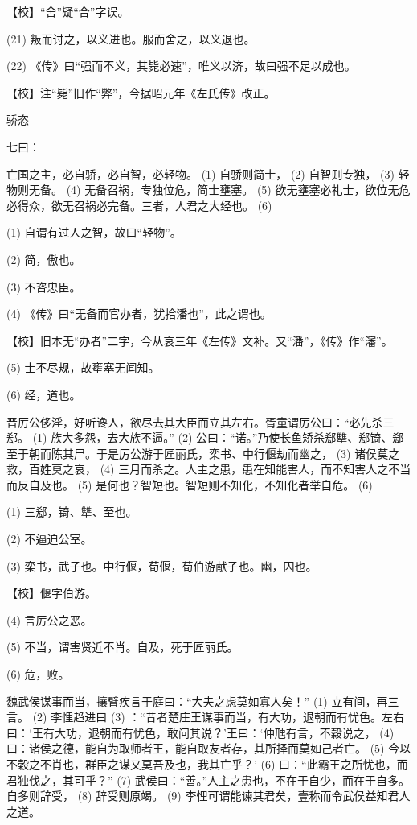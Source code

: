 \documentclass[12pt,UTF8]{ctexbook}
\begin{document}
【校】“舍”疑“合”字误。

(21) 叛而讨之，以义进也。服而舍之，以义退也。

(22) 《传》曰“强而不义，其毙必速”，唯义以济，故曰强不足以成也。

【校】注“毙”旧作“弊”，今据昭元年《左氏传》改正。





骄恣


七曰：

亡国之主，必自骄，必自智，必轻物。 (1) 自骄则简士， (2) 自智则专独， (3) 轻物则无备。 (4) 无备召祸，专独位危，简士壅塞。 (5) 欲无壅塞必礼士，欲位无危必得众，欲无召祸必完备。三者，人君之大经也。 (6)

(1) 自谓有过人之智，故曰“轻物”。

(2) 简，傲也。

(3) 不咨忠臣。

(4) 《传》曰“无备而官办者，犹拾潘也”，此之谓也。

【校】旧本无“办者”二字，今从哀三年《左传》文补。又“潘”，《传》作“瀋”。

(5) 士不尽规，故壅塞无闻知。

(6) 经，道也。

晋厉公侈淫，好听谗人，欲尽去其大臣而立其左右。胥童谓厉公曰：“必先杀三郄。 (1) 族大多怨，去大族不逼。” (2) 公曰：“诺。”乃使长鱼矫杀郄犨、郄锜、郄至于朝而陈其尸。于是厉公游于匠丽氏，栾书、中行偃劫而幽之， (3) 诸侯莫之救，百姓莫之哀， (4) 三月而杀之。人主之患，患在知能害人，而不知害人之不当而反自及也。 (5) 是何也？智短也。智短则不知化，不知化者举自危。 (6)

(1) 三郄，锜、犨、至也。

(2) 不逼迫公室。

(3) 栾书，武子也。中行偃，荀偃，荀伯游献子也。幽，囚也。

【校】偃字伯游。

(4) 言厉公之恶。

(5) 不当，谓害贤近不肖。自及，死于匠丽氏。

(6) 危，败。

魏武侯谋事而当，攘臂疾言于庭曰：“大夫之虑莫如寡人矣！” (1) 立有间，再三言。 (2) 李悝趋进曰 (3) ：“昔者楚庄王谋事而当，有大功，退朝而有忧色。左右曰：‘王有大功，退朝而有忧色，敢问其说？’王曰：‘仲虺有言，不穀说之， (4) 曰：诸侯之德，能自为取师者王，能自取友者存，其所择而莫如己者亡。 (5) 今以不穀之不肖也，群臣之谋又莫吾及也，我其亡乎？’ (6) 曰：“此霸王之所忧也，而君独伐之，其可乎？” (7) 武侯曰：“善。”人主之患也，不在于自少，而在于自多。自多则辞受， (8) 辞受则原竭。 (9) 李悝可谓能谏其君矣，壹称而令武侯益知君人之道。
\end{document}
